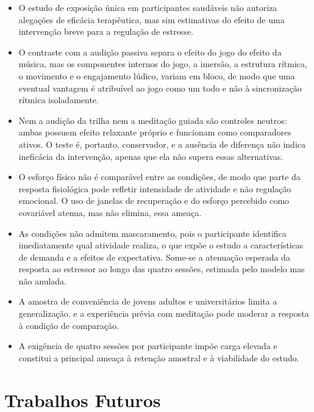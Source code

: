 \begin{itemize}
    \item O estudo de exposição única em participantes saudáveis não autoriza alegações de eficácia terapêutica, mas sim estimativas do efeito de uma intervenção breve para a regulação de estresse.
    \item O contraste com a audição passiva separa o efeito do jogo do efeito da música, mas os componentes internos do jogo, a imersão, a estrutura rítmica, o movimento e o engajamento lúdico, variam em bloco, de modo que uma eventual vantagem é atribuível ao jogo como um todo e não à sincronização rítmica isoladamente.
    \item Nem a audição da trilha nem a meditação guiada são controles neutros: ambas possuem efeito relaxante próprio e funcionam como comparadores ativos. O teste é, portanto, conservador, e a ausência de diferença não indica ineficácia da intervenção, apenas que ela não supera essas alternativas.
    \item O esforço físico não é comparável entre as condições, de modo que parte da resposta fisiológica pode refletir intensidade de atividade e não regulação emocional. O uso de janelas de recuperação e do esforço percebido como covariável atenua, mas não elimina, essa ameaça.
    \item As condições não admitem mascaramento, pois o participante identifica imediatamente qual atividade realiza, o que expõe o estudo a características de demanda e a efeitos de expectativa. Some-se a atenuação esperada da resposta ao estressor ao longo das quatro sessões, estimada pelo modelo mas não anulada.
    \item A amostra de conveniência de jovens adultos e universitários limita a generalização, e a experiência prévia com meditação pode moderar a resposta à condição de comparação.
    \item A exigência de quatro sessões por participante impõe carga elevada e constitui a principal ameaça à retenção amostral e à viabilidade do estudo.
\end{itemize}

\section{Trabalhos Futuros}\label{sec:conc-futuros}

